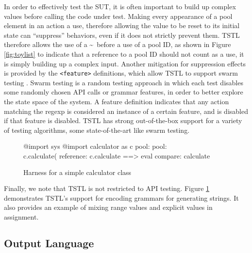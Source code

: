 \documentclass[runningheads,a4paper]{llncs}
\begin{document}
In order to effectively test the SUT, it is often important to build
up complex values before calling the code under test.  Making every
appearance of a pool element in an action a use, therefore allowing
the value to be reset to its initial state can ``suppress''
\cite{ISSRE13} behaviors, even if it does not strictly prevent them.
TSTL therefore allows the use of a \textasciitilde\ before a use of a
pool ID, as shown in Figure \ref{fig:toylist} to indicate that a
reference to a pool ID should not count as a use, it is simply
building up a complex input.  Another mitigation for suppression
effects is provided by the {\tt <feature>} definitions, which allow
TSTL to support swarm testing \cite{ISSTA12}.  Swarm testing is a
random testing approach in which each test disables some randomly
chosen API calls or grammar features, in order to better explore the
state space of the system.  A feature definition indicates that any
action matching the regexp is considered an instance of a certain
feature, and is disabled if that feature is disabled.  TSTL has strong out-of-the-box support for a variety of testing algorithms, some state-of-the-art like swarm testing.

\begin{figure}[t]
{\scriptsize
\begin{code}
@import sys
@import calculator as c
pool: %
pool: %
~%
~%
~%
~%
~%
c.calculate(%
reference: c.calculate ==> eval
compare: calculate
\end{code}
}
\caption{Harness for a simple calculator class}
\label{fig:calc}
\end{figure}




Finally, we note that TSTL is not restricted to API testing.  Figure
\ref{fig:calc} demonstrates TSTL's support for encoding grammars for
generating strings.  It also provides an example of mixing
range values and explicit values in assignment.

\subsection{Output Language}
\end{document}
